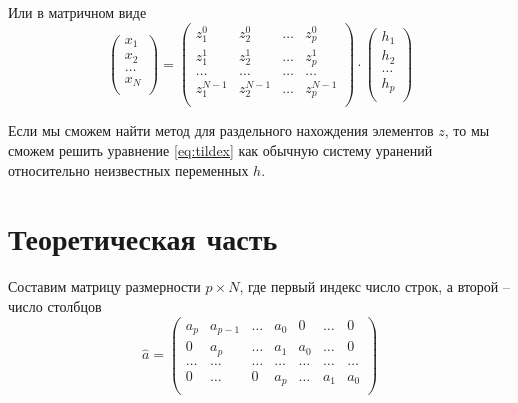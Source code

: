 \documentclass[a4paper,14pt]{extarticle}
\begin{document}
Или в матричном виде
\begin{equation}
    \label{eq:tildex}
    \begin{pmatrix}
        x_1 \\ 
        x_2 \\ 
        \dots \\ 
        x_N \\ 
    \end{pmatrix}
    =
    \begin{pmatrix}
        z_1^0 & z_2^0 & \dots & z_p^0 \\ 
        z_1^1 & z_2^1 & \dots & z_p^1 \\ 
        \dots & \dots & \dots & \dots \\
        z_1^{N-1} & z_2^{N-1} & \dots & z_p^{N-1} \\ 
    \end{pmatrix}
    \cdot 
    \begin{pmatrix}
        h_1 \\ 
        h_2 \\ 
        \dots \\ 
        h_p \\ 
    \end{pmatrix}
\end{equation}

Если мы сможем найти метод для раздельного нахождения элементов $z$, то мы
сможем решить уравнение \eqref{eq:tildex} как обычную систему уранений
относительно неизвестных переменных $h$.  



\section{Теоретическая часть}%
\label{sec:teoreticheskaia_chast_}


Составим матрицу размерности $p \times N$, где первый индекс число строк, а
второй -- число столбцов
 \begin{equation}
    \label{eq:a}
    \hat a = 
    \begin{pmatrix}
        a_p & a_{p-1} & \dots & a_0 & 0 & \dots & 0 \\
        0  & a_{p} & \dots & a_1 & a_0 & \dots & 0 \\
        \dots & \dots & \dots & \dots & \dots & \dots & \dots\\
        0  & \dots &  0  & a_p & \dots  & a_1 & a_{0} \\
    \end{pmatrix}
\end{equation}
\end{document}
